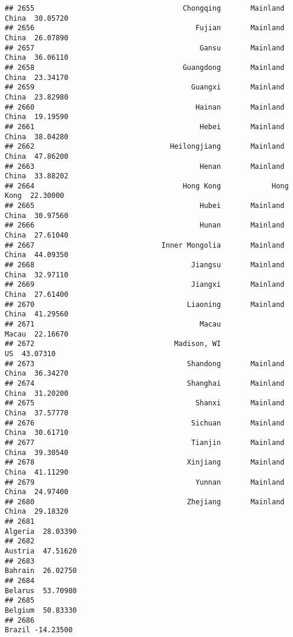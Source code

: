 \documentclass[
]{article}
\begin{document}
\begin{verbatim}
## 2655                                   Chongqing       Mainland China  30.05720
## 2656                                      Fujian       Mainland China  26.07890
## 2657                                       Gansu       Mainland China  36.06110
## 2658                                   Guangdong       Mainland China  23.34170
## 2659                                     Guangxi       Mainland China  23.82980
## 2660                                      Hainan       Mainland China  19.19590
## 2661                                       Hebei       Mainland China  38.04280
## 2662                                Heilongjiang       Mainland China  47.86200
## 2663                                       Henan       Mainland China  33.88202
## 2664                                   Hong Kong            Hong Kong  22.30000
## 2665                                       Hubei       Mainland China  30.97560
## 2666                                       Hunan       Mainland China  27.61040
## 2667                              Inner Mongolia       Mainland China  44.09350
## 2668                                     Jiangsu       Mainland China  32.97110
## 2669                                     Jiangxi       Mainland China  27.61400
## 2670                                    Liaoning       Mainland China  41.29560
## 2671                                       Macau                Macau  22.16670
## 2672                                 Madison, WI                   US  43.07310
## 2673                                    Shandong       Mainland China  36.34270
## 2674                                    Shanghai       Mainland China  31.20200
## 2675                                      Shanxi       Mainland China  37.57770
## 2676                                     Sichuan       Mainland China  30.61710
## 2677                                     Tianjin       Mainland China  39.30540
## 2678                                    Xinjiang       Mainland China  41.11290
## 2679                                      Yunnan       Mainland China  24.97400
## 2680                                    Zhejiang       Mainland China  29.18320
## 2681                                                          Algeria  28.03390
## 2682                                                          Austria  47.51620
## 2683                                                          Bahrain  26.02750
## 2684                                                          Belarus  53.70980
## 2685                                                          Belgium  50.83330
## 2686                                                           Brazil -14.23500

\end{verbatim}
\end{document}
